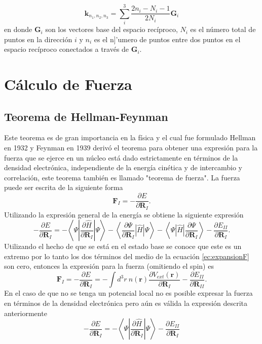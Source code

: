 \documentclass[12pt,a4paper, oneside]{book}
\begin{document}
   \begin{equation}
   \pmb{k}_{n_1, n_2, n_3} = \sum_{i}^{3} \frac{2 n_i -N_i-1}{2N_i} \pmb{G}_i \label{ec:sampleMP}
   \end{equation}
   en donde $\pmb{G}_i $ son los vectores base del espacio rec\'iproco, $N_i$ es el n\'umero total de puntos en la direcci\'on $i$ y $n_i$ es el n]'umero de puntos  entre dos puntos en el espacio rec\'iproco conectados a trav\'es de  $\pmb{G}_i $.
    
   \section{C\'alculo de Fuerza} \label{sec:Fuerza}
   \subsection{Teorema de Hellman-Feynman} \label{subsec:HellFey}
   Este teorema es de gran importancia en la f\'isica y el cual fue formulado Hellman en 1932 y Feynman en 1939 deriv\'o el teorema para obtener una expresi\'on  para la fuerza  que se ejerce en un n\'ucleo est\'a dado estrictamente en t\'erminos de la densidad electr\'onica, independiente de la energ\'ia cin\'etica y de intercambio y correlaci\'on, este teorema tambi\'en es llamado "teorema de fuerza".
   \newline
   La fuerza puede ser escrita de la siguiente forma
   \begin{equation}
   \pmb{F}_I = - \frac{\partial E}{\partial \pmb{R}_I}. \label{ec:Fuerza}
   \end{equation} 
   Utilizando la expresi\'on general de la energ\'ia se obtiene la siguiente expresi\'on
   \begin{equation}
   -\frac{\partial E}{\partial \pmb{R}_I} = - \left\langle \Psi \left| \frac{\partial \hat{H}}{\partial \pmb{R}_I} \right| \Psi \right\rangle- \left\langle \frac{\partial \Psi}{\partial \pmb{R}_I} \left| \hat{H} \right| \Psi \right\rangle - \left\langle \Psi \left| \hat{H} \right|  \frac{\partial \Psi}{\partial \pmb{R}_I} \right\rangle - \frac{\partial E_{II}}{\partial \pmb{R}_I}. \label{ec:expansionF}
   \end{equation}
   Utilizando el hecho de que se est\'a en el estado base se conoce que este es un extremo por lo tanto los dos t\'erminos del medio de la ecuaci\'on \ref{ec:expansionF} son cero, entonces la expresi\'on para la fuerza (omitiendo el spin) es
   \begin{equation}
   \pmb{F}_I = -\frac{\partial E}{\partial \pmb{R}_I} = - \int d^3 r ~n(\pmb{r}) \frac{\partial V_{ext} (\pmb{r})}{\partial \pmb{R}_I}- \frac{\partial E_{II}}{\partial \pmb{R}_{II}}. \label{ec:FHFuerza} 
   \end{equation} 
   En el caso de que no se tenga un potencial local no es posible expresar la fuerza en t\'erminos de la densidad electr\'onica pero a\'un es v\'alida la expresi\'on descrita anteriormente
   \begin{equation}
   -\frac{\partial E}{\partial \pmb{R}_I} = - \left\langle \Psi \left| \frac{\partial \hat{H}}{\partial \pmb{R}_I} \right| \Psi \right\rangle - \frac{\partial E_{II}}{\partial \pmb{R}_I} \label{ec:HFT}
   \end{equation}
\end{document}
